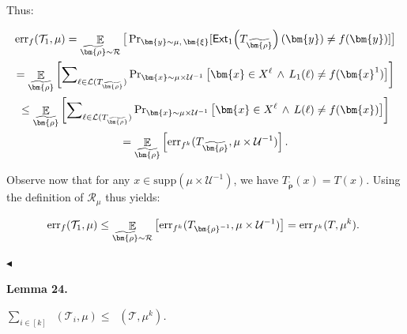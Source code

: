 \documentclass[10pt,a4paper]{article}
\begin{document}
Thus:\par


\[\begin{gathered}
\displaystyle\mathrm{err}_{f}(\mathcal{T}_{1},\mu) \displaystyle=\mathop{\mathbb{E}}_{\widetilde{\bm{\rho}}\sim\mathcal{R}}\big{[}\Pr\nolimits_{\bm{y}\sim\mu,\,\bm{\xi}}[\mathsf{Ext}_{1}\mathopen{}\left(T_{\widetilde{\bm{\rho}}}\mathclose{}\right)(\bm{y})\neq f(\bm{y})]\big{]} \\
\displaystyle=\mathop{\mathbb{E}}_{\widetilde{\bm{\rho}}}\left[\sum\nolimits_{\ell\in\mathcal{L}(T_{\widetilde{\bm{\rho}}})}\Pr\nolimits_{\bm{x}\sim\mu\times\mathcal{U}^{-1}}\big{[}\bm{x}\in X^{\ell}\,\wedge\,L_{1}(\ell)\neq f(\bm{x}^{1})\big{]}\right] \\
\displaystyle\leq\mathop{\mathbb{E}}_{\widetilde{\bm{\rho}}}\left[\sum\nolimits_{\ell\in\mathcal{L}(T_{\widetilde{\bm{\rho}}})}\Pr\nolimits_{\bm{x}\sim\mu\times\mathcal{U}^{-1}}\big{[}\bm{x}\in X^{\ell}\,\wedge\,L(\ell)\neq f(\bm{x})\big{]}\right] \\
\displaystyle=\mathop{\mathbb{E}}_{\widetilde{\bm{\rho}}}\left[\mathrm{err}_{f^{k}}(T_{\widetilde{\bm{\rho}}},\mu\times\mathcal{U}^{-1})\right].
\end{gathered}\]


Observe now that for any $x\in\mathrm{supp}(\mu\times\mathcal{U}^{-1})$, we have $T_{\widetilde{\bm{\rho}}}(x)=T(x)$. Using the definition of $\mathcal{R}_{\mu}$ thus yields:\par


\[\begin{gathered}
\mathrm{err}_{f}(\mathcal{T}_{1},\mu)\leq\mathop{\mathbb{E}}_{\widetilde{\bm{\rho}}\sim\mathcal{R}}\big{[}\mathrm{err}_{f^{k}}(T_{\bm{\rho}^{-1}},\mu\times\mathcal{U}^{-1})\big{]}=\mathrm{err}_{f^{k}}(T,\mu^{k}).\
\end{gathered}\]


$\blacktriangleleft$\par





\par\medskip\noindent\textbf{
\textbf{Lemma 24}\textbf{.}
}\par



$\sum_{i\in[k]}\mathop{\overline{sq}}(\mathcal{T}_{i},\mu)\leq\mathop{\overline{sq}}(\mathcal{T},\mu^{k})$\emph{.}\par
\end{document}
